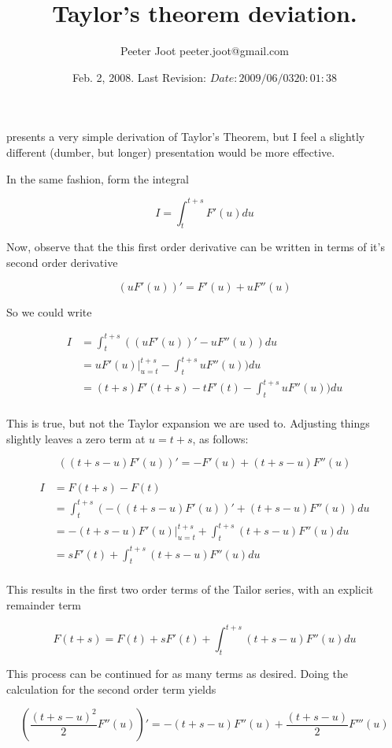 \documentclass{article}
\title{Taylor's theorem deviation.}
\author{Peeter Joot \quad peeter.joot@gmail.com}
\date{ Feb. 2, 2008. Last Revision: $Date: 2009/06/03 20:01:38 $ } %
\begin{document}
\maketitle{}

\cite{hestenes1999nfc} presents a very simple derivation of Taylor's Theorem,
but I feel a
slightly different (dumber, but longer) presentation would be more effective.

In the same fashion, form the integral

\[
I = \int_{t}^{t+s} F'(u) du
\]

Now, observe that the this first order derivative can be written in
terms of it's second order derivative

\[
(u F'(u))' = F'(u) + u F''(u)
\]

So we could write

\begin{align*}
I &= \int_{t}^{t+s} ((u F'(u))' - u F''(u)) du \\
  &= {u F'(u)} \vert_{u=t}^{t+s} - \int_{t}^{t+s} u F''(u)) du \\
  &= (t+s) F'(t+s) - t F'(t) - \int_{t}^{t+s} u F''(u)) du \\
\end{align*}

This is true, but not the Taylor expansion we are used to.  Adjusting things slightly leaves a zero term at $u=t+s$, as follows:

\[
\left((t + s - u) F'(u)\right)' = -F'(u) + (t+s-u) F''(u)
\]

\begin{align*}
I &= F(t+s) - F(t) \\
 &= \int_{t}^{t+s} ( - ((t + s - u) F'(u))' + (t+s-u) F''(u) ) du \\
 &= - {(t + s - u) F'(u)} \vert_{u=t}^{t+s} + \int_{t}^{t+s} (t+s-u) F''(u) du \\
 &= s F'(t) + \int_{t}^{t+s} (t+s-u) F''(u) du \\
\end{align*}

This results in the first two order terms of the Tailor series, with an explicit remainder term

\[
F(t+s) = F(t) + s F'(t) + \int_{t}^{t+s} (t+s-u) F''(u) du
\]

This process can be continued for as many terms as desired.  Doing the calculation for the second order term yields

\[
\left(\frac{(t + s - u)^2}{2} F''(u)\right)' = -( t + s - u ) F''(u) + \frac{(t+s-u)}{2} F'''(u)
\]
\end{document}
